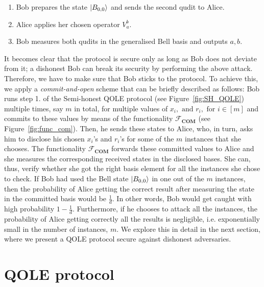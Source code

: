 \begin{enumerate}
    \item Bob prepares the state $\ket{B_{0,0}}$ and sends the second qudit to Alice.
    \item Alice applies her chosen operator $V^b_a$.
    \item Bob measures both qudits in the generalised Bell basis and outputs  $a,b$.
\end{enumerate}

It becomes clear that the protocol is secure only as long as Bob does not deviate from it; a dishonest Bob can break its security by performing the above attack. Therefore, we have to make sure that Bob sticks to the protocol. To achieve this, we apply a \textit{commit-and-open} scheme \cite{DFLSS09} that can be briefly described as follows:  Bob runs step 1. of the Semi-honest QOLE protocol (see Figure~\ref{fig:SH_QOLE}) multiple times, say $m$ in total, for multiple values of $x_i, \text{ and } r_i,\text{ for } i\in [m]$ and commits to these values by means of the functionality $\mathcal{F}_{\textbf{COM}}$ (see Figure~\ref{fig:func_com}). Then, he sends these states to Alice, who, in turn, asks him to disclose his chosen  $x_i$'s and $r_i$'s for some of the $m$ instances that she chooses. The functionality $\mathcal{F}_{\textbf{COM}}$ forwards these committed values to Alice and she measures the corresponding received states in the disclosed bases. She can, thus, verify whether she got the right basis element for all the instances she chose to check. If Bob had used the Bell state $\ket{B_{0,0}}$ in one out of the $m$ instances, then the probability of Alice getting the correct result after measuring the state in the committed basis would be $\frac{1}{d}$. In other words, Bob would get caught with high probability $1-\frac{1}{d}$. Furthermore, if he chooses to attack all the instances, the probability of Alice getting correctly all the results is negligible, i.e. exponentially small in the number of instances, $m$. We explore this in detail in the next section, where we present a  QOLE protocol secure against dishonest adversaries.

\section{QOLE protocol}\label{secureQROLE_overview}

